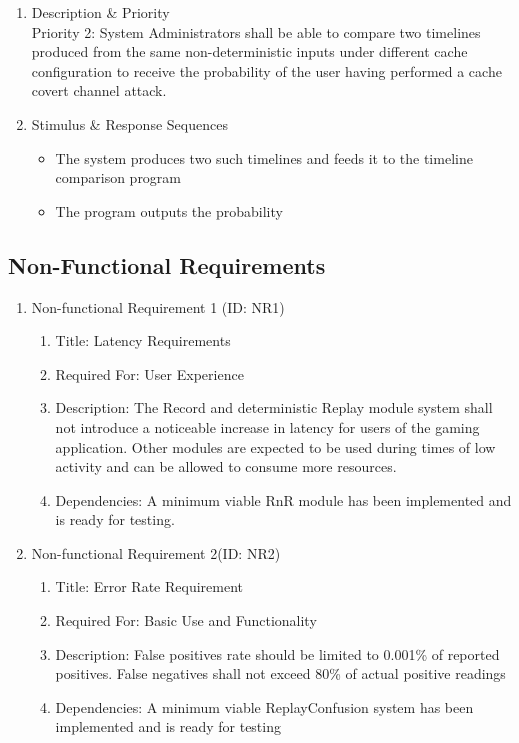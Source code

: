 \documentclass[12pt]{article}
\begin{document}
\begin{enumerate}
    \item Description \& Priority\\
    Priority 2: System Administrators shall be able to compare two timelines produced from the same non-deterministic
    inputs under different cache configuration to receive the probability of the user having performed a cache
    covert channel attack.
    \item Stimulus \& Response Sequences
    \begin{itemize}
        \item The system produces two such timelines and feeds it to the timeline comparison program
        \item The program outputs the probability
    \end{itemize}
\end{enumerate}

\subsection{Non-Functional Requirements}

\begin{enumerate}
    \item Non-functional Requirement 1 (ID: NR1) \begin{enumerate}
        \item Title: Latency Requirements
        \item Required For: User Experience
        \item Description: The Record and deterministic Replay module system shall not introduce a noticeable
        increase in latency for users of the gaming application. Other modules are expected to be used during
        times of low activity and can be allowed to consume more resources.
        \item Dependencies: A minimum viable RnR module has been implemented and is ready for testing.
    \end{enumerate}
    \item Non-functional Requirement  2(ID: NR2) \begin{enumerate}
        \item Title: Error Rate Requirement
        \item Required For: Basic Use and Functionality
        \item Description:  False positives rate should be limited to 0.001\% of reported positives. False
        negatives shall not exceed 80\% of actual positive readings
        \item Dependencies: A minimum viable ReplayConfusion system has been implemented and is ready for testing
    \end{enumerate}
\end{enumerate}
\end{document}
